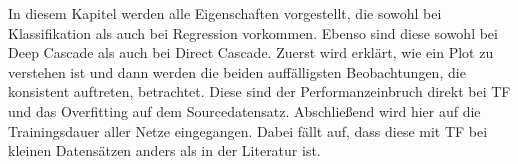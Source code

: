 In diesem Kapitel werden alle Eigenschaften vorgestellt, die sowohl bei Klassifikation als auch bei Regression vorkommen. 
Ebenso sind diese sowohl bei Deep Cascade als auch bei Direct Cascade. 
Zuerst wird erklärt, wie ein Plot zu verstehen ist und dann werden die beiden auffälligsten Beobachtungen, die konsistent auftreten, betrachtet. 
Diese sind der Performanzeinbruch direkt bei TF und das Overfitting auf dem Sourcedatensatz. 
Abschließend wird hier auf die Trainingsdauer aller Netze eingegangen. Dabei fällt auf, dass diese mit TF bei kleinen Datensätzen anders als in 
der Literatur ist.
